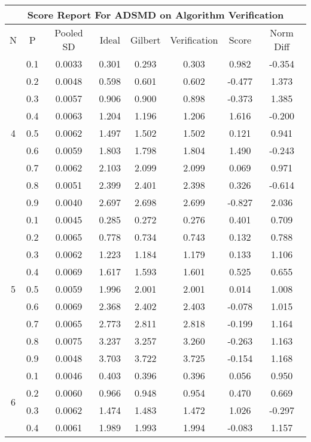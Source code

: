\documentclass[11pt,a4paper]{report}
\begin{document}
\begin{longtable}{ | c | c || c | c | c | c | c | c | }
\hline
\multicolumn{8}{|c|}{ Score Report For ADSMD on Algorithm Verification} \\
\hline
N & P & Pooled SD &  Ideal &  Gilbert & Verification  & Score & Norm Diff \\
 \hline
 \hline
 \endhead
\multirow{9}{*}{4} & 0.1 & 0.0033 & 0.301 & 0.293 & 0.303 & 0.982 & -0.354 \\
 & 0.2 & 0.0048 & 0.598 & 0.601 & 0.602 & -0.477 & 1.373 \\
 & 0.3 & 0.0057 & 0.906 & 0.900 & 0.898 & -0.373 & 1.385 \\
 & 0.4 & 0.0063 & 1.204 & 1.196 & 1.206 & 1.616 & -0.200 \\
 & 0.5 & 0.0062 & 1.497 & 1.502 & 1.502 & 0.121 & 0.941 \\
 & 0.6 & 0.0059 & 1.803 & 1.798 & 1.804 & 1.490 & -0.243 \\
 & 0.7 & 0.0062 & 2.103 & 2.099 & 2.099 & 0.069 & 0.971 \\
 & 0.8 & 0.0051 & 2.399 & 2.401 & 2.398 & 0.326 & -0.614 \\
 & 0.9 & 0.0040 & 2.697 & 2.698 & 2.699 & -0.827 & 2.036 \\
 \hline
\multirow{9}{*}{5} & 0.1 & 0.0045 & 0.285 & 0.272 & 0.276 & 0.401 & 0.709 \\
 & 0.2 & 0.0065 & 0.778 & 0.734 & 0.743 & 0.132 & 0.788 \\
 & 0.3 & 0.0062 & 1.223 & 1.184 & 1.179 & 0.133 & 1.106 \\
 & 0.4 & 0.0069 & 1.617 & 1.593 & 1.601 & 0.525 & 0.655 \\
 & 0.5 & 0.0059 & 1.996 & 2.001 & 2.001 & 0.014 & 1.008 \\
 & 0.6 & 0.0069 & 2.368 & 2.402 & 2.403 & -0.078 & 1.015 \\
 & 0.7 & 0.0065 & 2.773 & 2.811 & 2.818 & -0.199 & 1.164 \\
 & 0.8 & 0.0075 & 3.237 & 3.257 & 3.260 & -0.263 & 1.163 \\
 & 0.9 & 0.0048 & 3.703 & 3.722 & 3.725 & -0.154 & 1.168 \\
 \hline
\multirow{9}{*}{6} & 0.1 & 0.0046 & 0.403 & 0.396 & 0.396 & 0.056 & 0.950 \\
 & 0.2 & 0.0060 & 0.966 & 0.948 & 0.954 & 0.470 & 0.669 \\
 & 0.3 & 0.0062 & 1.474 & 1.483 & 1.472 & 1.026 & -0.297 \\
 & 0.4 & 0.0061 & 1.989 & 1.993 & 1.994 & -0.083 & 1.157 \\

\end{longtable}
\end{document}
